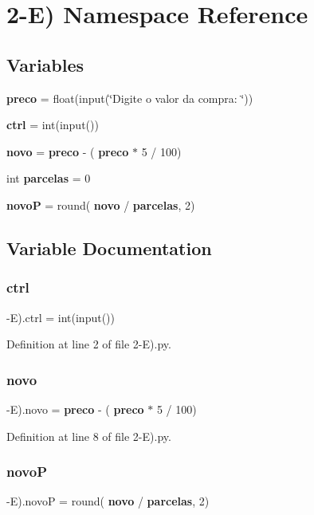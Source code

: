 \section{2-\/E) Namespace Reference}
\label{namespace2-_e_08}
\subsection*{Variables}
\begin{DoxyCompactItemize}
\item 
\textbf{ preco} = float(input(\char`\"{}Digite o valor da compra\+: \char`\"{}))
\item 
\textbf{ ctrl} = int(input())
\item 
\textbf{ novo} = \textbf{ preco} -\/ (\textbf{ preco} $\ast$ 5 / 100)
\item 
int \textbf{ parcelas} = 0
\item 
\textbf{ novoP} = round(\textbf{ novo} / \textbf{ parcelas}, 2)
\end{DoxyCompactItemize}


\subsection{Variable Documentation}
\mbox{\label{namespace2-_e_08_ae00bfcd5dcc6acebbe64872d97b8e0fb}} 
\subsubsection{ctrl}
{\footnotesize{}-\/E).ctrl = int(input())}



Definition at line 2 of file 2-\/\+E).\+py.

\mbox{\label{namespace2-_e_08_a86559e22c128cde08cd997604e3c086d}} 
\subsubsection{novo}
{\footnotesize{}-\/E).novo = \textbf{ preco} -\/ (\textbf{ preco} $\ast$ 5 / 100)}



Definition at line 8 of file 2-\/\+E).\+py.

\mbox{\label{namespace2-_e_08_aaad362f89bfd443b0bbb160eafacd092}} 
\subsubsection{novoP}
{\footnotesize{}-\/E).novoP = round(\textbf{ novo} / \textbf{ parcelas}, 2)}



